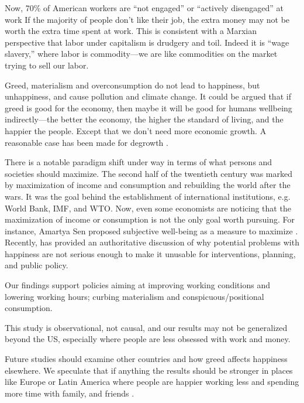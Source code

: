 \documentclass[10pt, letterpaper]{article}
\begin{document}
\begin{spacing}{1.8}
Now, 70\% of American workers are ``not engaged'' or ``actively disengaged'' at work \citep[][]{harvey14}
If the majority of people don't like their job, the extra money may not be worth the extra time spent at work. This is consistent with a Marxian perspective that labor under capitalism is drudgery and toil. Indeed it is ``wage slavery,'' where labor is commodity---we are like commodities on the market trying to sell our labor. 

Greed, materialism and overconsumption do not lead to happiness, but unhappiness, and cause pollution and climate change\citep{leonard10,pachauri14}.
 It could be argued that if greed is good for the economy, then maybe it will be
 good for humans wellbeing indirectly---the better the economy, the higher the
 standard of living, and the happier the people. Except that we don't need more
 economic growth. A reasonable case has been made for degrowth \cite{kallis12,kallis11,bergh11}.
 
There is a notable paradigm shift under way in terms of what persons and
societies should maximize. The second half of the twentieth century was marked
by maximization of income and consumption and rebuilding the world after the
wars. It was the goal behind the establishment of international institutions,
e.g. World Bank, IMF, and WTO. Now, even some economists are noticing that the maximization of income or consumption is not the only goal worth pursuing. For instance, Amartya Sen proposed subjective well-being as a measure to maximize \cite{stiglitz09al}. 
Recently, \citet{diener09} has provided an authoritative  
discussion of why potential problems with happiness are not serious enough to make it unusable for interventions, planning, and public policy.  

Our findings support policies aiming at improving working conditions and lowering working hours; curbing materialism and conspicuous/positional consumption. 

This study is observational, not causal, and our results may not be generalized beyond the US, especially where people are less obsessed with work and money. 

Future studies should examine other countries and how greed affects happiness elsewhere. We speculate that if anything the results should be stronger in places like Europe or Latin America where people are happier working less and spending more time with family, and friends \citep{valente16,valente15,aokditella}.  


\end{spacing}
\end{document}
